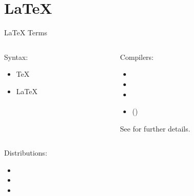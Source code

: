 \documentclass{setbeamer}
\begin{document}
\section{\LaTeX{}}
\begin{frame}{\LaTeX{} Terms}
    \begin{columns}
        \begin{column}{0.5\textwidth}
            Syntax:
            \begin{itemize}
                \item \TeX{}
                \item \LaTeX{}
            \end{itemize}
        \end{column}

        \begin{column}{0.5\textwidth}
            Compilers:
            \begin{itemize}
                \item {}
                \item {}
                \item {}
                \item ()
            \end{itemize}
            {\scriptsize See  for further details.\par}
        \end{column}
    \end{columns}


    \vspace{3mm}
    \begin{columns}
        \begin{column}{0.5\textwidth}
            Distributions:
            \begin{itemize}
                \item {}
                \item {}
                \item {}
            \end{itemize}
        \end{column}


\end{columns}
\end{frame}
\end{document}
